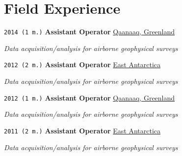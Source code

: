 \section*{Field Experience}

\TabPositions{7em,33em}

\noindent \texttt{2014 (1 m.)} \tab \textbf{Assistant Operator} \tab \href{https://en.wikipedia.org/wiki/Qaanaaq}{Qaanaaq, Greenland}
\begin{adjustwidth}{7em}{}
\textit{Data acquisition/analysis for airborne geophysical surveys}
\end{adjustwidth}
\vspace{.5em}

\noindent \texttt{2012 (2 m.)} \tab \textbf{Assistant Operator} \tab \href{https://en.wikipedia.org/wiki/East_Antarctic_Ice_Sheet}{East Antarctica}
\begin{adjustwidth}{7em}{}
\textit{Data acquisition/analysis for airborne geophysical surveys}
\end{adjustwidth}
\vspace{.5em}

\noindent \texttt{2012 (1 m.)} \tab \textbf{Assistant Operator} \tab \href{https://en.wikipedia.org/wiki/Qaanaaq}{Qaanaaq, Greenland}
\begin{adjustwidth}{7em}{}
\textit{Data acquisition/analysis for airborne geophysical surveys}
\end{adjustwidth}
\vspace{.5em}

\noindent \texttt{2011 (2 m.)} \tab \textbf{Assistant Operator} \tab \href{https://en.wikipedia.org/wiki/East_Antarctic_Ice_Sheet}{East Antarctica}
\begin{adjustwidth}{7em}{}
\textit{Data acquisition/analysis for airborne geophysical surveys}
\end{adjustwidth}